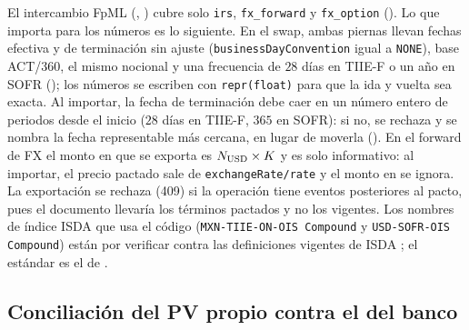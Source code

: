El intercambio FpML (, ) cubre solo \texttt{irs}, \texttt{fx\_forward} y \texttt{fx\_option} (). Lo que importa para los números es lo siguiente. En el swap, ambas piernas llevan fechas efectiva y de terminación sin ajuste (\texttt{businessDayConvention} igual a \texttt{NONE}), base ACT/360, el mismo nocional y una frecuencia de $28$ días en TIIE-F o un año en SOFR (); los números se escriben con \texttt{repr(float)} para que la ida y vuelta sea exacta. Al importar, la fecha de terminación debe caer en un número entero de periodos desde el inicio ($28$ días en TIIE-F, $365$ en SOFR): si no, se rechaza y se nombra la fecha representable más cercana, en lugar de moverla (). En el forward de FX el monto en \MXN que se exporta es $N_{\mathrm{USD}}\times K$ y es solo informativo: al importar, el precio pactado sale de \texttt{exchangeRate/rate} y el monto en \MXN se ignora. La exportación se rechaza (409) si la operación tiene eventos posteriores al pacto, pues el documento llevaría los términos pactados y no los vigentes. Los nombres de índice ISDA que usa el código (\texttt{MXN-TIIE-ON-OIS Compound} y \texttt{USD-SOFR-OIS Compound}) están por verificar contra las definiciones vigentes de ISDA \citep{isda2021}; el estándar es el de \citet{fpml2026}.

\subsection{Conciliación del PV propio contra el del banco}\label{sec:cap11-conciliacion}

